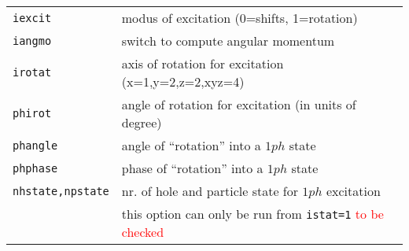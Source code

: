 \documentclass[12pt]{article}
\begin{document}
\begin{tabular}{ll}
{\tt iexcit} & modus of excitation (0=shifts, 1=rotation)\\
{\tt iangmo} & switch to compute angular momentum\\
{\tt irotat} & axis of rotation for excitation (x=1,y=2,z=2,xyz=4)\\
{\tt phirot} & angle of rotation for excitation (in units of degree)\\
{\tt phangle}        & angle of ``rotation'' into a $1ph$ state\\
{\tt phphase}        & phase of ``rotation'' into a $1ph$ state\\
{\tt nhstate,npstate}& nr. of hole and particle state for $1ph$
                      excitation\\
                     & this option can only be run from {\tt istat=1}
\textcolor{red}{to be checked}
\\
\hline
\end{tabular}
\end{document}
